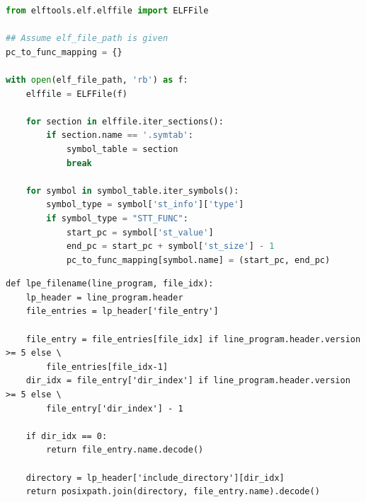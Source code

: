 \begin{center}
\begin{minipage}[t]{\textwidth}
\begin{lstlisting}[language=Python]
from elftools.elf.elffile import ELFFile

## Assume elf_file_path is given
pc_to_func_mapping = {}

with open(elf_file_path, 'rb') as f:
    elffile = ELFFile(f)

    for section in elffile.iter_sections():
        if section.name == '.symtab':
            symbol_table = section
            break

    for symbol in symbol_table.iter_symbols():
        symbol_type = symbol['st_info']['type']
        if symbol_type = "STT_FUNC":
            start_pc = symbol['st_value']
            end_pc = start_pc + symbol['st_size'] - 1
            pc_to_func_mapping[symbol.name] = (start_pc, end_pc)

\end{lstlisting}
\end{minipage}
\end{center}


\begin{center}
\begin{minipage}{\textwidth}
\begin{lstlisting}
def lpe_filename(line_program, file_idx):
    lp_header = line_program.header
    file_entries = lp_header['file_entry']

    file_entry = file_entries[file_idx] if line_program.header.version >= 5 else \
        file_entries[file_idx-1]
    dir_idx = file_entry['dir_index'] if line_program.header.version >= 5 else \
        file_entry['dir_index'] - 1

    if dir_idx == 0:
        return file_entry.name.decode()

    directory = lp_header['include_directory'][dir_idx]
    return posixpath.join(directory, file_entry.name).decode()
\end{lstlisting}
\end{minipage}
\end{center}

